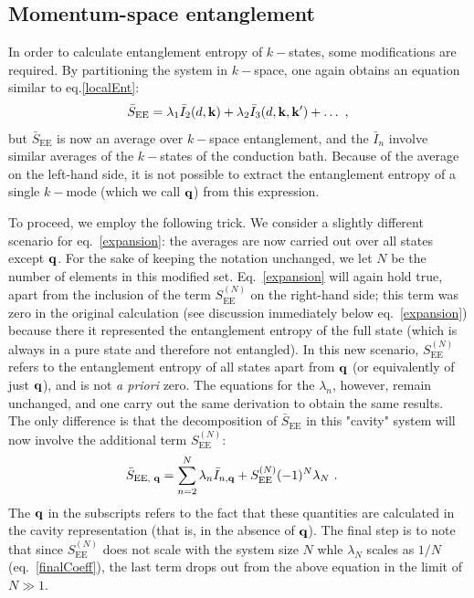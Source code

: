 \documentclass[reprint,hidelinks,onecolumn]{revtex4-2}
\begin{document}
\subsection{Momentum-space entanglement}
In order to calculate entanglement entropy of \(k-\)states, some modifications are required. By partitioning the system in \(k-\)space, one again obtains an equation similar to eq.\ref{localEnt}:
\begin{equation}\begin{aligned}
	\bar S_\text{EE} = \lambda_1 \bar I_2(d,{\bf k}) + \lambda_2 \bar I_3(d,{\bf k},{\bf k}^\prime) + \ldots~,
\end{aligned}\end{equation}
but \(\bar S_\text{EE}\) is now an average over \(k-\)space entanglement, and the \(\bar I_n\) involve similar averages of the \(k-\)states of the conduction bath. Because of the average on the left-hand side, it is not possible to extract the entanglement entropy of a single \(k-\)mode (which we call \({\bf q}\)) from this expression. 

To proceed, we employ the following trick. We consider a slightly different scenario for eq.~\ref{expansion}: the averages are now carried out over all states except \({\bf q}\). For the sake of keeping the notation unchanged, we let \(N\) be the number of elements in this modified set. Eq.~\ref{expansion} will again hold true, apart from the inclusion of the term \(S_\text{EE}^{(N)}\) on the right-hand side; this term was zero in the original calculation (see discussion immediately below eq.~\ref{expansion}) because there it represented the entanglement entropy of the full state (which is always in a pure state and therefore not entangled). In this new scenario, \(S_\text{EE}^{(N)}\) refers to the entanglement entropy of all states apart from \({\bf q}\) (or equivalently of just \({\bf q}\)), and is not {\it a priori} zero. The equations for the \(\lambda_n\), however, remain unchanged, and one carry out the same derivation to obtain the same results. The only difference is that the decomposition of \(\bar S_\text{EE}\) in this "cavity" system will now involve the additional term \(S_\text{EE}^{(N)}\):
\begin{equation}\begin{aligned}
	\bar S_\text{EE, {\bf q}} &= \sum_{n=2}^N \lambda_n \bar I_{n, {\bf q}} + S_\text{EE}^{(N)}(-1)^N \lambda_N~.
\end{aligned}\end{equation}
The \({\bf q}\) in the subscripts refers to the fact that these quantities are calculated in the cavity representation (that is, in the absence of \({\bf q}\)). The final step is to note that since \(S_\text{EE}^{(N)}\) does not scale with the system size \(N\) whle \(\lambda_N\) scales as \(1/N\) (eq.~\ref{finalCoeff}), the last term drops out from the above equation in the limit of \(N \gg 1\).
\end{document}
